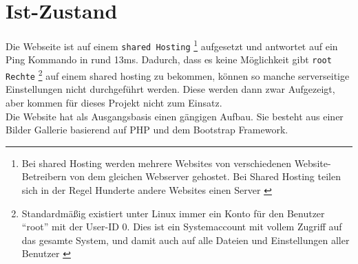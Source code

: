 \section{Ist-Zustand} %
\label{sec:Ist-Zustand}
	Die Webseite ist auf einem \texttt{shared Hosting}
	\footnote{Bei shared Hosting werden mehrere Websites von verschiedenen Website-Betreibern von dem gleichen Webserver gehostet. Bei Shared Hosting teilen sich in der Regel Hunderte andere Websites einen Server \autocite{itWissen}} 
	aufgesetzt und antwortet auf ein Ping Kommando in rund 13ms. Dadurch, dass es keine Möglichkeit gibt \texttt{root Rechte} \footnote{Standardmäßig existiert unter Linux immer ein Konto für den Benutzer "`root"' mit der User-ID 0. Dies ist ein Systemaccount mit vollem Zugriff auf das gesamte System, und damit auch auf alle Dateien und Einstellungen aller Benutzer \autocite{ubuntu14}} auf einem shared hosting zu bekommen, können so manche serverseitige Einstellungen nicht durchgeführt werden. Diese werden dann zwar Aufgezeigt, aber kommen für dieses Projekt nicht zum Einsatz.\\
	Die Website hat als Ausgangsbasis einen gängigen Aufbau. Sie besteht aus einer Bilder Gallerie basierend auf PHP und dem Bootstrap Framework.
